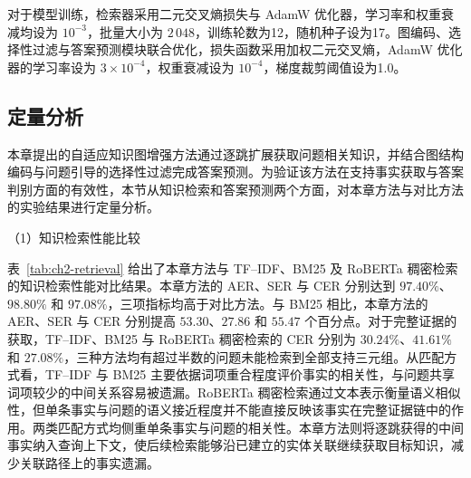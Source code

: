 对于模型训练，检索器采用二元交叉熵损失与 AdamW 优化器，学习率和权重衰减均设为 $10^{-3}$，批量大小为 $2\,048$，训练轮数为12，随机种子设为17。图编码、选择性过滤与答案预测模块联合优化，损失函数采用加权二元交叉熵，AdamW 优化器的学习率设为 $3\times10^{-4}$，权重衰减设为 $10^{-4}$，梯度裁剪阈值设为1.0。


\subsection{定量分析}

本章提出的自适应知识图增强方法通过逐跳扩展获取问题相关知识，并结合图结构编码与问题引导的选择性过滤完成答案预测。为验证该方法在支持事实获取与答案判别方面的有效性，本节从知识检索和答案预测两个方面，对本章方法与对比方法的实验结果进行定量分析。

\noindent（1）知识检索性能比较

表~\ref{tab:ch2-retrieval} 给出了本章方法与 TF--IDF、BM25\cite{robertson2009bm25} 及 RoBERTa 稠密检索的知识检索性能对比结果。本章方法的 AER、SER 与 CER 分别达到 $97.40\%$、$98.80\%$ 和 $97.08\%$，三项指标均高于对比方法。与 BM25 相比，本章方法的 AER、SER 与 CER 分别提高 $53.30$、$27.86$ 和 $55.47$ 个百分点。对于完整证据的获取，TF--IDF、BM25 与 RoBERTa 稠密检索的 CER 分别为 $30.24\%$、$41.61\%$ 和 $27.08\%$，三种方法均有超过半数的问题未能检索到全部支持三元组。从匹配方式看，TF--IDF 与 BM25 主要依据词项重合程度评价事实的相关性，与问题共享词项较少的中间关系容易被遗漏。RoBERTa 稠密检索通过文本表示衡量语义相似性，但单条事实与问题的语义接近程度并不能直接反映该事实在完整证据链中的作用。两类匹配方式均侧重单条事实与问题的相关性。本章方法则将逐跳获得的中间事实纳入查询上下文，使后续检索能够沿已建立的实体关联继续获取目标知识，减少关联路径上的事实遗漏。


